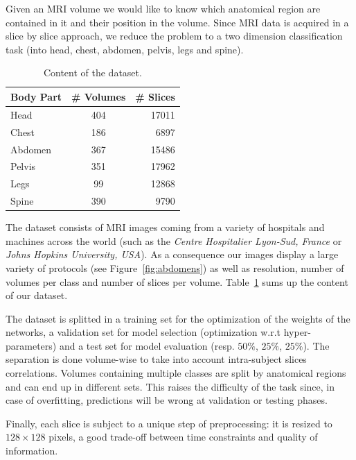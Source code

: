 Given an MRI volume we would like to know which anatomical region are contained in it and their position in the volume. Since MRI data is acquired in a slice by slice approach, we reduce the problem to a two dimension classification task (into head, chest, abdomen, pelvis, legs and spine).

\begin{table}
	\centering
	\begin{tabular}{ | l | c | r | }
		\hline
		Body Part & \# Volumes & \# Slices \\ \hline
		Head & 404 & 17011 \\
		Chest & 186 & 6897 \\
		Abdomen & 367 & 15486 \\
		Pelvis & 351 & 17962 \\
		Legs & 99 & 12868 \\
		Spine & 390 & 9790 \\
		\hline
	\end{tabular}
	\caption{Content of the dataset.}
	\label{table:dataset}
\end{table}

The dataset consists of MRI images coming from a variety of hospitals and machines across the world (such as the \textit{Centre Hospitalier Lyon-Sud, France} or \textit{ Johns Hopkins University, USA}). As a consequence our images display a large variety of protocols (see Figure~\ref{fig:abdomens}) as well as resolution, number of volumes per class and number of slices per volume. Table~\ref{table:dataset} sums up the content of our dataset.

The dataset is splitted in a training set for the optimization of the weights of the networks, a validation set for model selection (optimization w.r.t hyper-parameters) and a test set for model evaluation (resp. $50 \%$, $25 \%$, $25 \%$). The separation is done volume-wise to take into account intra-subject slices correlations. Volumes containing multiple classes are split by anatomical regions and can end up in different sets. This raises the difficulty of the task since, in case of overfitting, predictions will be wrong at validation or testing phases.


Finally, each slice is subject to a unique step of preprocessing: it is resized to $128 \times 128$ pixels, a good trade-off between time constraints and quality of information.


